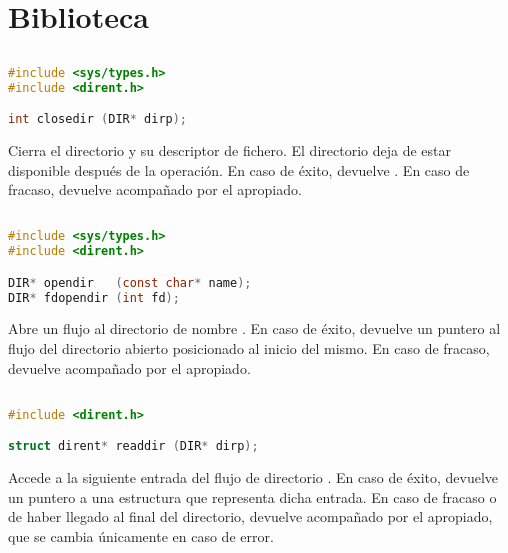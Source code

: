 \chapter{Biblioteca }

\section{}\label{closedir}

\begin{lstlisting}[language=C]
#include <sys/types.h>
#include <dirent.h>

int closedir (DIR* dirp);
\end{lstlisting}

Cierra el directorio  y su descriptor de fichero.
El directorio deja de estar disponible después de la operación.
En caso de éxito, devuelve .
En caso de fracaso, devuelve  acompañado por el  apropiado.

\section{}\label{opendir}

\begin{lstlisting}[language=C]
#include <sys/types.h>
#include <dirent.h>

DIR* opendir   (const char* name);
DIR* fdopendir (int fd);
\end{lstlisting}

Abre un flujo al directorio de nombre .
En caso de éxito, devuelve un puntero al flujo del directorio abierto posicionado al inicio del mismo.
En caso de fracaso, devuelve  acompañado por el  apropiado.

\section{}\label{readdir}

\begin{lstlisting}[language=C]
#include <dirent.h>

struct dirent* readdir (DIR* dirp);
\end{lstlisting}

Accede a la siguiente entrada del flujo de directorio .
En caso de éxito, devuelve un puntero a una estructura  que representa dicha entrada.
En caso de fracaso o de haber llegado al final del directorio, devuelve  acompañado por el  apropiado, que se cambia únicamente en caso de error.


